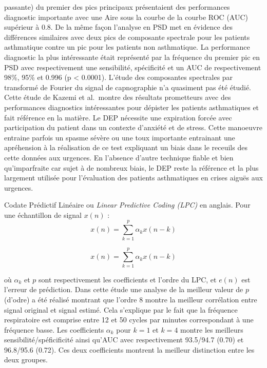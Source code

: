 \documentclass[12pt,]{article}
\begin{document}
passante) du premier des pics principaux présentaient des performances
diagnostic importante avec une Aire sous la courbe de la courbe ROC
(AUC) supérieur à 0.8. De la même façon l'analyse en PSD met en évidence
des différences similaires avec deux pics de composante spectrale pour
les patients asthmatique contre un pic pour les patients non
asthmatique. La performance diagnostic la plus intéressante était
représenté par la fréquence du premier pic en PSD avec respectivement
une sensibilité, spécificité et un AUC de respectivement 98\%, 95\% et
0.996 (p \textless{} 0.0001). L'étude des composantes spectrales par
transformé de Fourier du signal de capnographie n'a quasiment pas été
étudié. Cette étude de Kazemi et al.~montre des résultats prometteurs
avec des performances diagnostics intéressantes pour dépister les
patients asthmatiques et fait référence en la matière. Le DEP nécessite
une expiration forcée avec participation du patient dans un contexte
d'anxiété et de stress. Cette manoeuvre entraine parfois un spasme
sévère ou une toux importante entrainant une apréhension à la
réalisation de ce test expliquant un biais dans le receuils des cette
données aux urgences. En l'absence d'autre technique fiable et bien
qu'imparfraite car sujet à de nombreux biais, le DEP reste la référence
et la plus largement utilisée pour l'évaluation des patients
asthmatiques en crises aiguës aux urgences.

Codate Prédictif Linéaire ou \emph{Linear Predictive Coding (LPC)} en
anglais. Pour une échantillon de signal \(x(n)\) :
\[x(n)=\sum_{k=1}^{p} \alpha_{k}x(n-k)\]

\begin{equation}
    x(n)=\sum_{k=1}^{p} \alpha_{k}x(n-k)
\label{Linear Predictive Coding}
\end{equation}

où \(\alpha_{k}\) et \(p\) sont respectivement les coefficients et
l'ordre du LPC, et \(e(n)\) est l'erreur de prédiction. Dans cette étude
une analyse de la meilleur valeur de \(p\) (d'odre) a été réalisé
montrant que l'ordre 8 montre la meilleur corrélation entre signal
original et signal estimé. Cela s'explique par le fait que la fréquence
respiratoire est comprise entre 12 et 50 cycles par minutes
correspondant à une fréquence basse. Les coefficients \(\alpha_{k}\)
pour \(k=1\) et \(k=4\) montre les meilleurs sensibilité/spéficificité
ainsi qu'AUC avec respectivement 93.5/94.7 (0.70) et 96.8/95.6 (0.72).
Ces deux coefficients montrent la meilleur distinction entre les deux
groupes.
\end{document}
